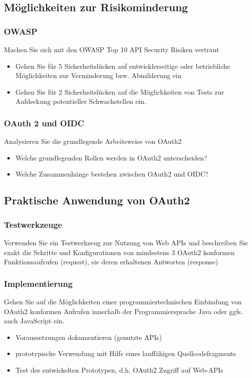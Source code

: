 \documentclass[notitlepage, hidelinks]{article}
\begin{document}
\subsection{Möglichkeiten zur Risikominderung}
\subsubsection{OWASP}
Machen Sie sich mit den OWASP Top 10 API Security Risiken vertraut
\begin{itemize}
\item Gehen Sie für 5 Sicherheitslücken auf entwicklerseitige oder betriebliche Möglichkeiten zur Verminderung bzw. Abmilderung ein
\item Gehen Sie für 2 Sicherheitslücken auf die Möglichkeiten von Tests zur Aufdeckung potentieller Schwachstellen ein.
\end{itemize}

\subsubsection{OAuth 2 und OIDC}
Analysieren Sie die grundlegende Arbeitsweise von OAuth2
\begin{itemize}
\item Welche grundlegenden Rollen werden in OAuth2 unterscheiden?
\item Welche Zusammenhänge bestehen zwischen OAuth2 und OIDC?
\end{itemize}

\subsection{Praktische Anwendung von OAuth2}
\subsubsection{Testwerkzeuge}
Verwenden Sie ein Testwerkzeug zur Nutzung von Web APIs und beschreiben Sie exakt die Schritte und Konfigurationen von mindestens 3 OAuth2 konformen Funktionsaufrufen (request), sie deren erhaltenen Antworten (response)

\subsubsection{Implementierung}
Gehen Sie auf die Möglichkeiten einer programmiertechnischen Einbindung von OAuth2 konformen Aufrufen innerhalb der Programmiersprache Java oder ggfs. auch JavaScript ein. 
\begin{itemize}
\item Voraussetzungen dokumentieren (genutzte APIs)
\item prototypische Verwendung mit Hilfe eines lauffähigen Quellcodefragments
\item Test des entwickelten Prototypen, d.h. OAuth2 Zugriff auf Web-APIs
\end{itemize}

\newpage




\end{document}
